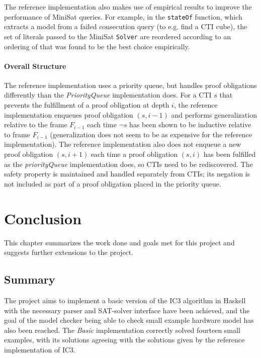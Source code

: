 \documentclass[12pt,a4paper,twoside,openright]{report}
\begin{document}
{The reference implementation also makes use of empirical results to improve the performance of MiniSat queries.
For example, in the \verb,stateOf, function, which extracts a model from a failed consecution query
(to e.g. find a CTI cube), the set of literals passed to the MiniSat \verb,Solver, are reordered according
to an ordering of that was found to be the best choice empirically.

\subsubsection{Overall Structure}

The reference implementation uses a priority queue, but handles proof obligations differently
than the {\it PriorityQueue} implementation does. For a CTI $s$ that prevents the fulfillment
of a proof obligation at depth $i$, the reference implementation enqueues proof obligation $(s,i - 1)$
and performs generalization relative to the frame $F_{i - 1}$ each time $\neg s$ has been shown
to be inductive relative to frame $F_{i - 1}$ (generalization does not seem
to be as expensive for the reference implementation).
The reference implementation also does not
enqueue a new proof obligation $(s, i+1)$ each time a proof obligation $(s, i)$ has been
fulfilled as the {\it priorityQueue} implementation does, so CTIs need to be rediscovered.
The safety property is maintained and
handled separately from CTIs; its negation is not included as part of a proof obligation
placed in the priority queue.

\chapter{Conclusion}

This chapter summarizes the work done and goals met for this project and suggests further extensions
to the project.

\section{Summary}

The project aims to implement a basic version of the IC3 algorithm in Haskell with the necessary parser
and SAT-solver interface have been achieved, and the goal of the model checker being able to check
small example hardware model has also been reached. The \emph{Basic} implementation correctly
solved fourteen small examples, with its solutions agreeing with the solutions given by the
reference implementation of IC3.

}
\end{document}
